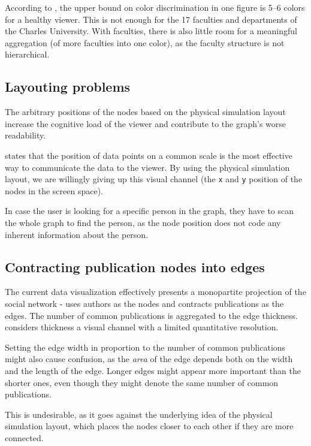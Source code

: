 According to \cite{Cleveland1985}, the upper bound on color discrimination in one figure is 5–6 colors for a healthy viewer. 
This is not enough for the 17 faculties and departments of the Charles University. 
With faculties, there is also little room for a meaningful aggregation (of more faculties into one color), as the faculty structure is not hierarchical.

\subsection{Layouting problems} \label{sec:layouting-problems}

The arbitrary positions of the nodes based on the physical simulation layout increase the cognitive load 
of the viewer and contribute to the graph's worse readability.

\cite{munzner2015visualization} states that the position of data points on a common scale is the most effective way to communicate the data to the viewer.
By using the physical simulation layout, we are willingly giving up this visual channel (the \texttt{x} and \texttt{y} position of the nodes in the screen space).

In case the user is looking for a specific person in the graph, they have to scan the whole graph to find the person, as the node position does not code any inherent information about the person.

\subsection{Contracting publication nodes into edges}

The current data visualization effectively presents a monopartite projection of the social network - uses authors as the nodes and contracts publications as the edges.
The number of common publications is aggregated to the edge thickness. \cite{10.5555/2385879} considers thickness a visual channel with a limited quantitative resolution.

Setting the edge width in proportion to the number of common publications might also cause confusion, as the \textit{area} of the edge depends both on the width and the length of the edge.
Longer edges might appear more important than the shorter ones, even though they might denote the same number of common publications.

This is undesirable, as it goes against the underlying idea of the physical simulation layout, which places the nodes closer to each other if they are more connected.

